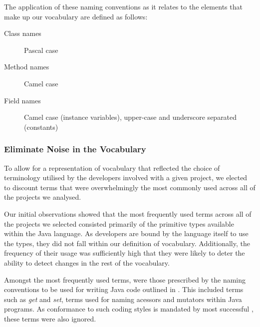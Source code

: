 The application of these naming conventions as it relates to the elements that make up our vocabulary are defined as follows:

\begin{description}
	\item[Class names] Pascal case
	\item[Method names] Camel case 
	\item[Field names] Camel case (instance variables), upper-case and underscore separated (constants)
\end{description}


\subsubsection{Eliminate Noise in the Vocabulary} %
\label{ssub:eliminate_noise_in_the_vocabulary}



To allow for a representation of vocabulary that reflected the choice of terminology utilised by the developers involved with a given project, we elected to discount terms that were overwhelmingly the most commonly used across all of the projects we analysed.

Our initial observations showed that the most frequently used terms across all of the projects we selected consisted primarily of the primitive types available within the Java language. As developers are bound by the language itself to use the types, they did not fall within our definition of vocabulary. Additionally, the frequency of their usage was sufficiently high that they were likely to deter the ability to detect changes in the rest of the vocabulary.

Amongst the most frequently used terms, were those prescribed by the naming conventions to be used for writing Java code outlined in \cite{Reddy00a}. This included terms such as \emph{get} and \emph{set}, terms used for naming acessors and mutators within Java programs. As conformance to such coding styles is mandated by most successful \OSYS, these terms were also ignored.

